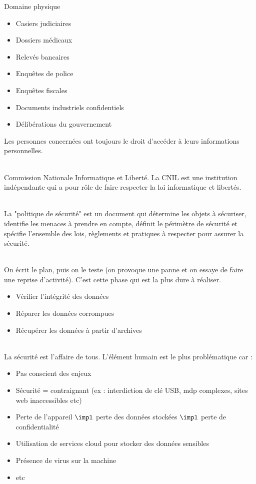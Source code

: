  Domaine physique

	\begin{itemize}
		\item Casiers judiciaires
		\item Dossiers médicaux
		\item Relevés bancaires
		\item Enquêtes de police
		\item Enquêtes fiscales
		\item Documents industriels confidentiels
		\item Délibérations du gouvernement
	\end{itemize}
	Les personnes concernées ont toujours le droit d'accéder à leurs informations personnelles.

\\Commission Nationale Informatique et Liberté. La CNIL est une institution indépendante qui a pour rôle de faire respecter la loi informatique et libertés.

\\La "politique de sécurité" est un document qui détermine les objets à sécuriser, identifie les menaces à prendre en compte, définit le périmètre de sécurité et spécifie l'ensemble des lois, règlements et pratiques à respecter pour assurer la sécurité.

\\On écrit le plan, puis on le teste (on provoque une panne et on essaye de faire une reprise d'activité). C'est cette phase qui est la plus dure à réaliser.
	\begin{itemize}
		\item Vérifier l'intégrité des données
		\item Réparer les données corrompues
		\item Récupérer les données à partir d'archives
	\end{itemize}

\\La sécurité est l'affaire de tous. L'élément humain est le plus problématique car :
	\begin{itemize}
		\item Pas conscient des enjeux
		\item Sécurité = contraignant (ex : interdiction de clé USB, mdp complexes, sites web inaccessibles etc)
	\end{itemize}

	\begin{itemize}
		\item Perte de l'appareil $\impl$ perte des données stockées $\impl$ perte de confidentialité
		\item Utilisation de services cloud pour stocker des données sensibles
		\item Présence de virus sur la machine
		\item etc
	\end{itemize}
